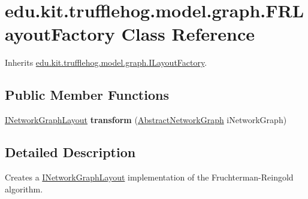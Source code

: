 \hypertarget{classedu_1_1kit_1_1trufflehog_1_1model_1_1graph_1_1_f_r_layout_factory}{}\section{edu.\+kit.\+trufflehog.\+model.\+graph.\+F\+R\+Layout\+Factory Class Reference}
\label{classedu_1_1kit_1_1trufflehog_1_1model_1_1graph_1_1_f_r_layout_factory}


Inherits \hyperlink{interfaceedu_1_1kit_1_1trufflehog_1_1model_1_1graph_1_1_i_layout_factory}{edu.\+kit.\+trufflehog.\+model.\+graph.\+I\+Layout\+Factory}.

\subsection*{Public Member Functions}
\begin{DoxyCompactItemize}
\item 
\hypertarget{classedu_1_1kit_1_1trufflehog_1_1model_1_1graph_1_1_f_r_layout_factory_ae5dd3b0ca5b46b440482549ce9ee35c9}{}\hyperlink{interfaceedu_1_1kit_1_1trufflehog_1_1model_1_1graph_1_1_i_network_graph_layout}{I\+Network\+Graph\+Layout} {\bfseries transform} (\hyperlink{classedu_1_1kit_1_1trufflehog_1_1model_1_1graph_1_1_abstract_network_graph}{Abstract\+Network\+Graph} i\+Network\+Graph)\label{classedu_1_1kit_1_1trufflehog_1_1model_1_1graph_1_1_f_r_layout_factory_ae5dd3b0ca5b46b440482549ce9ee35c9}

\end{DoxyCompactItemize}


\subsection{Detailed Description}
Creates a \hyperlink{interfaceedu_1_1kit_1_1trufflehog_1_1model_1_1graph_1_1_i_network_graph_layout}{I\+Network\+Graph\+Layout} implementation of the Fruchterman-\/\+Reingold algorithm. 